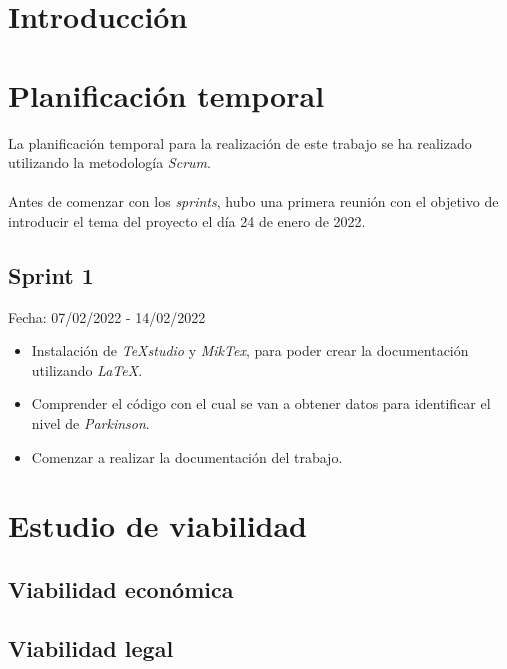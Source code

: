 
\section{Introducción}

\section{Planificación temporal}
La planificación temporal para la realización de este trabajo se ha realizado utilizando la metodología \textit{Scrum}.\\
\\
Antes de comenzar con los \textit{sprints}, hubo una primera reunión con el objetivo de introducir el tema del proyecto el día 24 de enero de 2022.

\subsection{Sprint 1}
Fecha: 07/02/2022 - 14/02/2022
\begin{itemize}
	\item Instalación de \textit{TeXstudio} y \textit{MikTex}, para poder crear la documentación utilizando \textit{LaTeX}.
	\item Comprender el código con el cual se van a obtener datos para identificar el nivel de \textit{Parkinson}.
	\item Comenzar a realizar la documentación del trabajo.
\end{itemize}

\section{Estudio de viabilidad}

\subsection{Viabilidad económica}

\subsection{Viabilidad legal}